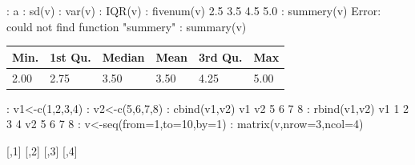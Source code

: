 \documentclass[a4paper,12pt]{article}
\begin{document}
{{: a
\newline
: sd(v)
\newline
: var(v)
\newline
: IQR(v)
\newline
: fivenum(v)
 2.5 3.5 4.5 5.0
\newline
: summery(v)
\newline
Error: could not find function "summery"
\newline
: summary(v)
\newline
\begin{table}[!htbp]
	\begin{center}
		\def\arraystretch{2.0}
		\begin{tabular}{| p{2cm} | p{2cm} | p{2cm} | p{2cm} | p{2cm} | p{2cm}}
			\hline
			Min.	& 1st Qu.	& Median	& Mean	& 3rd Qu. & Max \\
			\hline
			2.00 & 2.75 & 3.50 & 3.50 & 4.25 & 5.00
			\\
			\hline
			
		\end{tabular}
	
		\label{tab:hreq}
	\end{center}	
\end{table}


: v1<-c(1,2,3,4)
\newline
: v2<-c(5,6,7,8)
\newline
: cbind(v1,v2)
\newline
v1 v2
  5
  6
  7
  8
\newline
: rbind(v1,v2)
\newline
[,1] [,2] [,3] [,4]
\newline
v1    1    2    3    4
\newline
v2    5    6    7    8
\newline
: v<-seq(from=1,to=10,by=1)
\newline
: matrix(v,nrow=3,ncol=4)
\newline

     [,1] [,2] [,3] [,4]
\newline
     
}}
\end{document}
